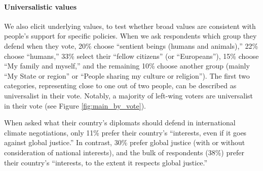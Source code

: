 \begin{tcolorbox}\label{subsec:universalistic}
  \paragraph{Universalistic values}

We also elicit underlying values, to test whether broad values are consistent with people's support for specific policies. %
When we ask respondents which group they defend when they vote, %
20\% choose ``sentient beings (humans and animals),'' 22\% choose ``humans,'' 33\% select their ``fellow citizens'' (or ``Europeans''), 15\% choose ``My family and myself,'' and the remaining 10\% choose another group (mainly ``My State or region'' or ``People sharing my culture or religion''). The first two categories, representing close to one out of two people, 
can be described as universalist in their vote. Notably, a majority of left-wing voters are universalist in their vote (see Figure \ref{fig:main_by_vote}). %

When asked what their country's diplomats should defend in international climate negotiations, only 11\% prefer their country's ``interests, even if it goes against global justice.'' In contrast, 30\% prefer global justice (with or without consideration of national interests), and the bulk of respondents (38\%) prefer their country's ``interests, to the extent it respects global justice.''


\end{tcolorbox}
